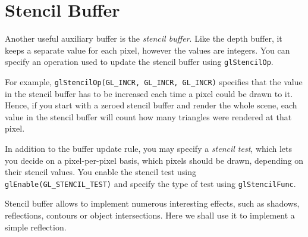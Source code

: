 \documentclass{article}
\begin{document}
\section{Stencil Buffer}
Another useful auxiliary buffer is the \emph{stencil buffer}. Like the depth buffer, it keeps a separate value for each pixel, however the values are integers. You can specify an operation used to update the stencil buffer using \texttt{glStencilOp}. 

For example, \verb#glStencilOp(GL_INCR, GL_INCR, GL_INCR)# specifies that the value in the stencil buffer has to be increased each time a pixel could be drawn to it. Hence, if you start with a zeroed stencil buffer and render the whole scene, each value in the stencil buffer will count how many triangles were rendered at that pixel.

In addition to the buffer update rule, you may specify a \emph{stencil test}, which lets you decide on a pixel-per-pixel basis, which pixels should be drawn, depending on their stencil values. You enable the stencil test using \\ \verb#glEnable(GL_STENCIL_TEST)# and specify the type of test using \verb#glStencilFunc#.

Stencil buffer allows to implement numerous interesting effects, such as shadows, reflections, contours or object intersections. Here we shall use it to implement a simple reflection.
\end{document}
